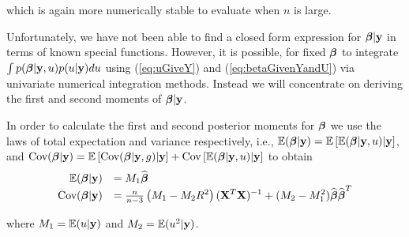 \noindent which is again more numerically stable to evaluate
when $n$ is large.
 
Unfortunately, we have not been able to find a closed form expression
for ${\boldsymbol \beta}|{\bf y}$ in terms of known special functions. However,
it is possible, for fixed ${\boldsymbol \beta}$ to integrate $\int p({\boldsymbol \beta}|{\bf y},u)p(u|{\bf y})du$
using  (\ref{eq:uGiveY})  and (\ref{eq:betaGivenYandU})
via univariate numerical integration methods.
Instead we will concentrate on deriving the first and second moments of ${\boldsymbol \beta}|{\bf y}$.


In order to calculate the first and second posterior moments for ${\boldsymbol \beta}$
we use the laws of total expectation and variance respectively, i.e.,
${\mathbb E}({\boldsymbol \beta}|{\bf y}) = {\mathbb E}\left[ {\mathbb E}({\boldsymbol \beta}|{\bf y},u) |{\bf y} \right]$, and
$\mbox{Cov}({\boldsymbol \beta}|{\bf y})  = {\mathbb E}\left[
\mbox{Cov}({\boldsymbol \beta}|{\bf y},g)|{\bf y}
\right] + \mbox{Cov}\left[
{\mathbb E}({\boldsymbol \beta}|{\bf y},u)|{\bf y}
\right]$ 
to obtain
$$
\begin{array}{rll}
\ds \bE(\vbeta|\vy) 
& \ds = M_1 \widehat{\vbeta}
\\ %
\ds \mbox{Cov}(\vbeta|\vy) 
& \ds = \tfrac{n}{n - 3} 
\left( M_1 - M_2 R^2\right) (\mX^T\mX)^{-1}
+ (M_2 - M_1^2) \widehat{\vbeta}  \widehat{\vbeta}^T
\end{array}
$$

\noindent where
$M_1 
= {\mathbb E}(u|{\bf y})$
and
$M_2 
= {\mathbb E}(u^2|{\bf y})$.


